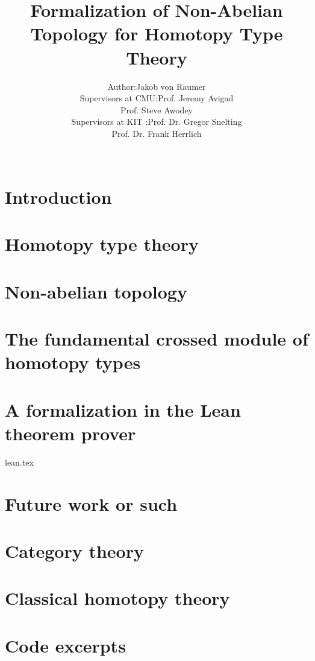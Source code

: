 \documentclass[12pt,openany]{book}
\theoremstyle{definition}
\begin{document}
\title{Formalization of Non-Abelian Topology for Homotopy Type Theory}
\author{\begin{tabular}{r@{ }l} 
Author:      & Jakob von Raumer \\[1ex] 
Supervisors at CMU: & Prof. Jeremy Avigad\\
             & Prof. Steve Awodey \\[1ex]
Supervisors at KIT : & Prof. Dr. Gregor Snelting\\
			& Prof. Dr. Frank Herrlich
\end{tabular}\\
}


\maketitle

\tableofcontents

\chapter{Introduction}



\chapter{Homotopy type theory}



\chapter{Non-abelian topology}

 

\chapter{The fundamental crossed module of homotopy types}



\chapter{A formalization in the Lean theorem prover}

 {lean.tex}

\chapter{Future work or such}




\appendix

\chapter{Category theory}

\chapter{Classical homotopy theory}

\chapter{Code excerpts}
\end{document}
